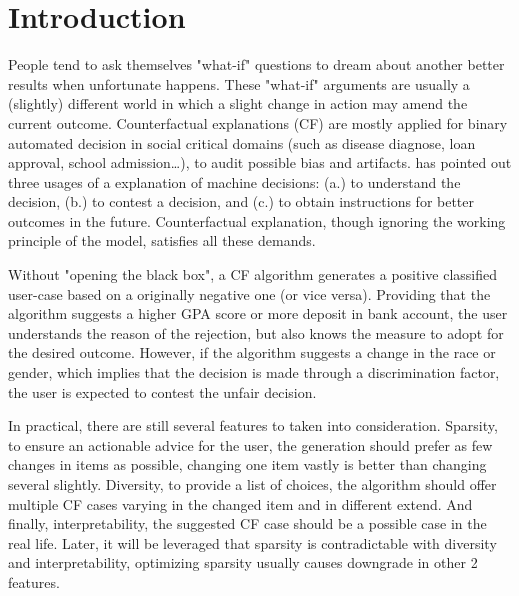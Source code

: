 \section{Introduction}
 People tend to ask themselves "what-if" questions to dream about another better results when unfortunate happens. These "what-if" arguments are usually a (slightly) different world in which a slight change in action may amend the current outcome. Counterfactual explanations (CF) are mostly applied for binary automated decision in social critical domains (such as disease diagnose, loan approval, school admission\dots), to audit possible bias and artifacts. \cite{watcher2017} has pointed out three usages of a explanation of machine decisions: (a.) to understand the decision, (b.) to contest a decision, and (c.) to obtain instructions for better outcomes in the future. Counterfactual explanation, though ignoring the working principle of the model, satisfies all these demands.

 Without "opening the black box", a CF algorithm generates a positive classified user-case based on a originally negative one (or vice versa). Providing that the algorithm suggests a higher GPA score or more deposit in bank account, the user understands the reason of the rejection, but also knows the measure to adopt for the desired outcome. However, if the algorithm suggests a change in the race or gender, which implies that the decision is made through a discrimination factor, the user is expected to contest the unfair decision.

 In practical, there are still several features to taken into consideration. Sparsity, to ensure an actionable advice for the user, the generation should prefer as few changes in items as possible, changing one item vastly is better than changing several slightly. Diversity, to provide a list of choices, the algorithm should offer multiple CF cases varying in the changed item and in different extend. And finally, interpretability, the suggested CF case should be a possible case in the real life. Later, it will be leveraged that sparsity is contradictable with diversity and interpretability, optimizing sparsity usually causes downgrade in other 2 features.

